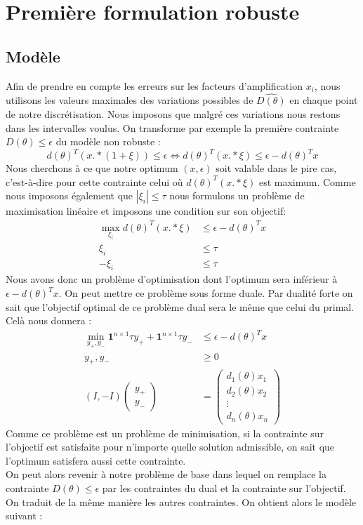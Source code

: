 \section{Première formulation robuste}
\subsection{Modèle}

Afin de prendre en compte les erreurs sur les facteurs d'amplification $x_i$, nous utilisons les valeurs maximales des variations possibles de $\hat{D(\theta)}$ en chaque point de notre discrétisation. Nous imposons que malgré ces variations nous restons dans les intervalles voulus. On transforme par exemple la première contrainte $D(\theta)\leq \epsilon$ du modèle non robuste :
\begin{equation}
d(\theta)^T (x.*(1+\xi)) \leq \epsilon \Longleftrightarrow d(\theta)^T (x.*\xi) \leq \epsilon- d(\theta)^T x
\end{equation}
Nous cherchons à ce que notre optimum $(x,\epsilon)$ soit valable dans le pire cas, c'est-à-dire pour cette contrainte celui où $d(\theta)^T (x.*\xi)$ est maximum. Comme nous imposons également que $|\xi_i|\leq \tau$ nous formulons un problème de maximisation linéaire et imposons une condition sur son objectif: 
\begin{align*}
\max_{\xi_i} d(\theta)^T (x.*\xi)  & \leq  \epsilon- d(\theta)^T x \\
\xi_i & \leq \tau \\
-\xi_i & \leq \tau 
\end{align*}
Nous avons donc un problème d'optimisation dont l'optimum sera inférieur à $\epsilon- d(\theta)^T x $. On peut mettre ce problème sous forme duale. Par dualité forte on sait que l'objectif optimal de ce problème dual sera le même que celui du primal. Celà nous donnera :
\begin{align*}
\min_{y_+,y_-} \mathbf{1}^{n\times 1}\tau y_++\mathbf{1}^{n\times 1}\tau y_- & \leq \epsilon- d(\theta)^T x \\
y_+,y_-  & \geq  0 \\
(I,-I)\begin{pmatrix}
y_+ \\
y_-
\end{pmatrix}
& = 
\begin{pmatrix}
d_1(\theta)x_1 \\
d_2(\theta)x_2 \\
\vdots \\
d_n(\theta)x_n 
\end{pmatrix}
\end{align*}
Comme ce problème est un problème de minimisation, si la contrainte sur l'objectif est satisfaite pour n'importe quelle solution admissible, on sait que l'optimum satisfera aussi cette contrainte.\\
On peut alors revenir à notre problème de base dans lequel on remplace la contrainte $D(\theta)\leq \epsilon$ par les contraintes du dual et la contrainte sur l'objectif.
On traduit de la même manière les autres contraintes. On obtient alors le modèle suivant :

